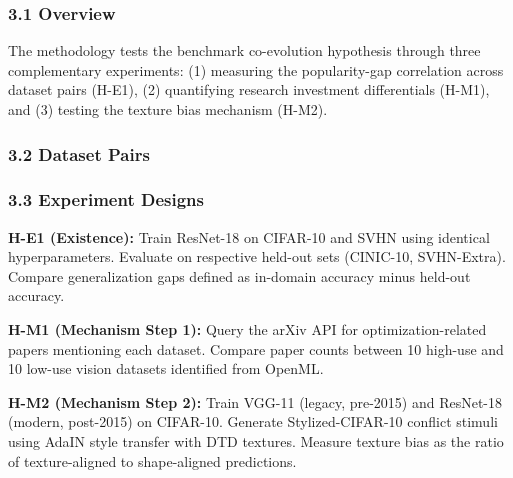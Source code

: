 
\subsubsection{3.1 Overview}

The methodology tests the benchmark co-evolution hypothesis through three complementary experiments: (1) measuring the popularity-gap correlation across dataset pairs (H-E1), (2) quantifying research investment differentials (H-M1), and (3) testing the texture bias mechanism (H-M2).

\subsubsection{3.2 Dataset Pairs}

\begin{table}[htbp]
\centering
{}
\end{table}

\subsubsection{3.3 Experiment Designs}

\textbf{H-E1 (Existence):} Train ResNet-18 on CIFAR-10 and SVHN using identical hyperparameters. Evaluate on respective held-out sets (CINIC-10, SVHN-Extra). Compare generalization gaps defined as in-domain accuracy minus held-out accuracy.

\textbf{H-M1 (Mechanism Step 1):} Query the arXiv API for optimization-related papers mentioning each dataset. Compare paper counts between 10 high-use and 10 low-use vision datasets identified from OpenML.

\textbf{H-M2 (Mechanism Step 2):} Train VGG-11 (legacy, pre-2015) and ResNet-18 (modern, post-2015) on CIFAR-10. Generate Stylized-CIFAR-10 conflict stimuli using AdaIN style transfer with DTD textures. Measure texture bias as the ratio of texture-aligned to shape-aligned predictions.

